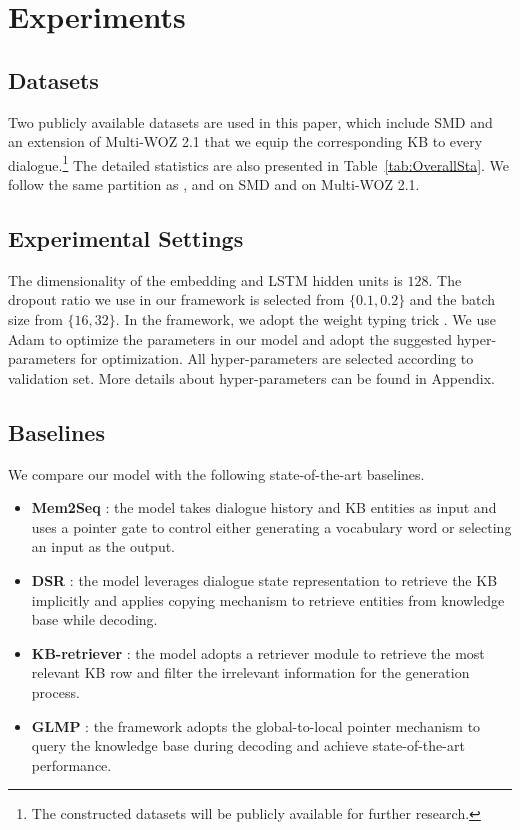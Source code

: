 \documentclass[11pt,a4paper]{article}
\begin{document}
\section{Experiments}
\subsection{Datasets}
Two publicly available datasets are used in this paper, which include SMD \cite{eric-etal-2017-key}
and an extension of Multi-WOZ 2.1 \cite{budzianowski-etal-2018-multiwoz} that we equip the corresponding KB to every dialogue.\footnote{The constructed datasets will be publicly available for further research.}
The detailed statistics are also presented in  Table~\ref{tab:OverallSta}.
 We follow the same partition as ,  and  on SMD and \cite{budzianowski-etal-2018-multiwoz} on Multi-WOZ 2.1.
 

\subsection{Experimental Settings}
The dimensionality of the embedding and LSTM hidden units is $128$. The dropout ratio we use in our framework is selected from $\{0.1,0.2\}$ and the batch size from  $\{16,32\}$. In the framework, we adopt the weight typing trick \cite{DBLP:conf/iclr/WuSX19}.
We use Adam \cite{DBLP:journals/corr/KingmaB14} to optimize the parameters in our model and adopt the suggested hyper-parameters for optimization.
All hyper-parameters are selected according to validation set.
More details about hyper-parameters can be found in Appendix.

\subsection{Baselines}
We compare our model with the following state-of-the-art baselines.
\begin{itemize}
	\item  \textbf{Mem2Seq} \cite{madotto-etal-2018-mem2seq}:
	the model takes dialogue history and KB entities
	as input and uses a pointer gate
	to control either generating a vocabulary word or selecting 
	an input as the output.
	\item \textbf{DSR} \cite{wen-etal-2018-sequence}: the model leverages dialogue state representation to retrieve the KB implicitly and  applies copying mechanism to retrieve entities from knowledge base while decoding.
	\item  \textbf{KB-retriever} \cite{qin-etal-2019-entity}: the model adopts a retriever module to retrieve the most relevant KB row and filter the irrelevant information for the generation process.
	\item  \textbf{GLMP} \cite{DBLP:conf/iclr/WuSX19}:  the framework adopts the global-to-local pointer mechanism to query the knowledge base during decoding and achieve state-of-the-art performance.
\end{itemize}
\end{document}

